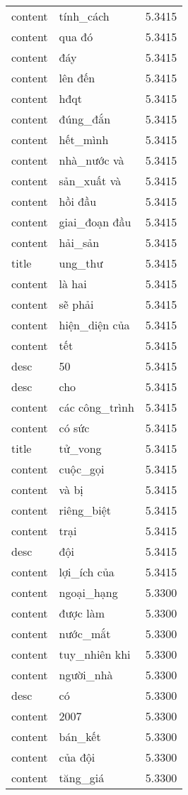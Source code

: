 \documentclass{article}
\begin{document}
\begin{tabular}{lll}
content & tính\_cách & 5.3415\\
content & qua đó & 5.3415\\
content & đáy & 5.3415\\
content & lên đến & 5.3415\\
content & hđqt & 5.3415\\
content & đúng\_đắn & 5.3415\\
content & hết\_mình & 5.3415\\
content & nhà\_nước và & 5.3415\\
content & sản\_xuất và & 5.3415\\
content & hồi đầu & 5.3415\\
content & giai\_đoạn đầu & 5.3415\\
content & hải\_sản & 5.3415\\
title & ung\_thư & 5.3415\\
content & là hai & 5.3415\\
content & sẽ phải & 5.3415\\
content & hiện\_diện của & 5.3415\\
content & tết & 5.3415\\
desc & 50 & 5.3415\\
desc & cho & 5.3415\\
content & các công\_trình & 5.3415\\
content & có sức & 5.3415\\
title & tử\_vong & 5.3415\\
content & cuộc\_gọi & 5.3415\\
content & và bị & 5.3415\\
content & riêng\_biệt & 5.3415\\
content & trại & 5.3415\\
desc & đội & 5.3415\\
content & lợi\_ích của & 5.3415\\
content & ngoại\_hạng & 5.3300\\
content & được làm & 5.3300\\
content & nước\_mắt & 5.3300\\
content & tuy\_nhiên khi & 5.3300\\
content & người\_nhà & 5.3300\\
desc & có & 5.3300\\
content & 2007 & 5.3300\\
content & bán\_kết & 5.3300\\
content & của đội & 5.3300\\
content & tăng\_giá & 5.3300\\

\end{tabular}
\end{document}
